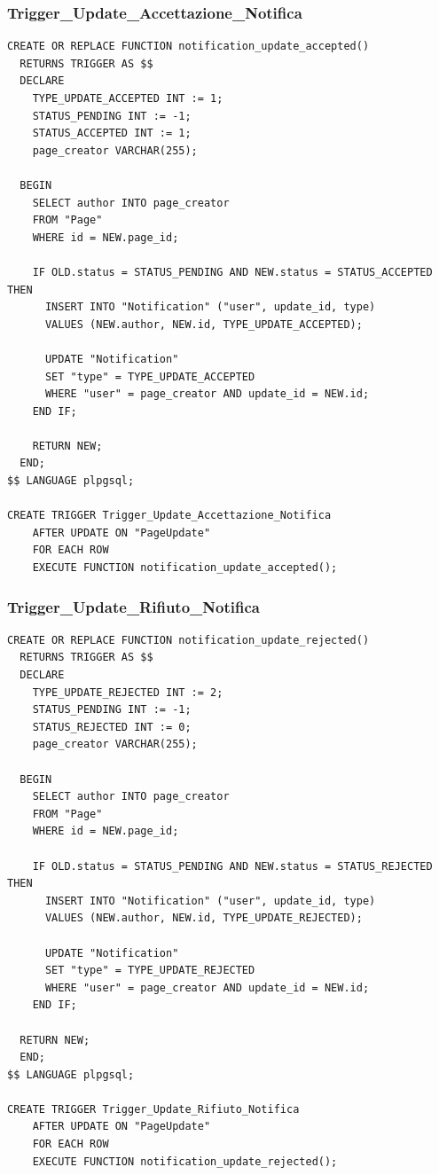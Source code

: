 \documentclass{article}
\begin{document}
	\newpage
	
	\subsubsection{Trigger\_Update\_Accettazione\_Notifica}
	
	\begin{lstlisting}[style=SQL]
CREATE OR REPLACE FUNCTION notification_update_accepted()
  RETURNS TRIGGER AS $$
  DECLARE
	TYPE_UPDATE_ACCEPTED INT := 1;
	STATUS_PENDING INT := -1;
	STATUS_ACCEPTED INT := 1;
	page_creator VARCHAR(255);
				
  BEGIN
	SELECT author INTO page_creator
	FROM "Page"
	WHERE id = NEW.page_id;
		
	IF OLD.status = STATUS_PENDING AND NEW.status = STATUS_ACCEPTED THEN
	  INSERT INTO "Notification" ("user", update_id, type)
  	  VALUES (NEW.author, NEW.id, TYPE_UPDATE_ACCEPTED);
		
	  UPDATE "Notification"
	  SET "type" = TYPE_UPDATE_ACCEPTED
	  WHERE "user" = page_creator AND update_id = NEW.id;
	END IF;
		
    RETURN NEW;
  END;
$$ LANGUAGE plpgsql;
		
CREATE TRIGGER Trigger_Update_Accettazione_Notifica
	AFTER UPDATE ON "PageUpdate"
	FOR EACH ROW
	EXECUTE FUNCTION notification_update_accepted();
	\end{lstlisting}
	
	\newpage
	
	\subsubsection{Trigger\_Update\_Rifiuto\_Notifica}
	
	\begin{lstlisting}[style=SQL]
CREATE OR REPLACE FUNCTION notification_update_rejected()
  RETURNS TRIGGER AS $$
  DECLARE
	TYPE_UPDATE_REJECTED INT := 2;
	STATUS_PENDING INT := -1;
	STATUS_REJECTED INT := 0;
	page_creator VARCHAR(255);
				
  BEGIN
	SELECT author INTO page_creator
	FROM "Page"
	WHERE id = NEW.page_id;
		
	IF OLD.status = STATUS_PENDING AND NEW.status = STATUS_REJECTED THEN
	  INSERT INTO "Notification" ("user", update_id, type)
	  VALUES (NEW.author, NEW.id, TYPE_UPDATE_REJECTED);
		
	  UPDATE "Notification"
  	  SET "type" = TYPE_UPDATE_REJECTED
	  WHERE "user" = page_creator AND update_id = NEW.id;
	END IF;
		
  RETURN NEW;
  END;
$$ LANGUAGE plpgsql;
		
CREATE TRIGGER Trigger_Update_Rifiuto_Notifica
	AFTER UPDATE ON "PageUpdate"
	FOR EACH ROW
	EXECUTE FUNCTION notification_update_rejected();
\end{lstlisting}
	
	
	
\end{document}

